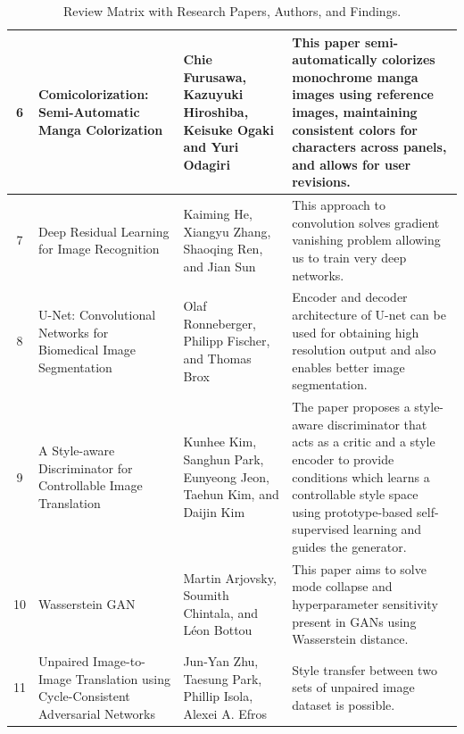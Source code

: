 \begin{table}[htbp]
\centering
  \begin{tabular}{|c|p{4cm}|p{3cm}|p{4.5cm}|}
    \hline  
 
    6 & 
    Comicolorization: Semi-Automatic Manga Colorization \cite{furusawa2017comicolorization} & 
    Chie Furusawa, Kazuyuki Hiroshiba, Keisuke Ogaki and Yuri Odagiri & 
    This paper semi-automatically colorizes monochrome manga images using reference images, maintaining consistent colors for characters across panels, and allows for user revisions. 
    \\ \hline
  

    7 & Deep Residual Learning for Image Recognition \cite{he2015deep} & Kaiming He, Xiangyu Zhang, Shaoqing Ren, and Jian Sun & 
     This approach to convolution solves gradient vanishing problem allowing us to train very deep networks. 
     \\ \hline

    8 & U-Net: Convolutional Networks for Biomedical Image Segmentation \cite{ronneberger2015unet} & Olaf Ronneberger, Philipp Fischer, and Thomas Brox &
     Encoder and decoder architecture of U-net can be used for obtaining high resolution output and also enables 
     better image segmentation.
     \\ \hline

    9 & A Style-aware Discriminator for Controllable Image Translation \cite{kim2022styleaware} & Kunhee Kim, Sanghun Park, Eunyeong Jeon, Taehun Kim, and Daijin Kim &  
    The paper proposes a style-aware discriminator that acts as a critic and a style encoder to provide conditions which learns a controllable style space using prototype-based self-supervised learning and guides the generator.\cite{kim2022styleaware}
    \\ \hline

    10 & Wasserstein GAN \cite{arjovsky2017wasserstein} & Martin Arjovsky, Soumith Chintala, and Léon Bottou & This paper aims to solve mode collapse and hyperparameter sensitivity present in GANs using Wasserstein distance. 
    \\ \hline

    11 & Unpaired Image-to-Image Translation using Cycle-Consistent Adversarial Networks
    \cite{zhu2020unpaired} &
    Jun-Yan Zhu, Taesung Park, Phillip Isola, Alexei A. Efros & Style transfer between two sets of unpaired image dataset is possible. 
    \\ \hline
    
 \end {tabular}
  \caption{ Review Matrix with Research Papers, Authors, and Findings.}
  \label{tab:literature}
\end{table}
